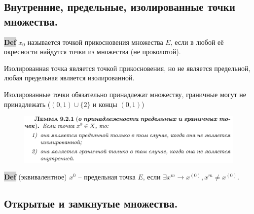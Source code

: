 \documentclass{article}
\begin{document}
\subsection{Внутренние, предельные, изолированные точки множества.}
\begin{figure}[h!]
    \centering
\end{figure}
{\bfseries\colorbox{lightgray}{Def}} $x_0$ называется точкой прикосновения множества $E$, если в любой её окресности найдутся точки из множества (не проколотой).

Изолированная точка является точкой прикосновения, но не является предельной, любая предельная является изолированной.

Изолированные точки обязательно принадлежат множеству, граничные могут не принадлежать ($(0,1)\cup \{2\}$ и концы $(0,1)$)
\begin{figure}[h!]
    \centering
    \includegraphics[width=\textwidth]{8.png}
    \vspace{-1cm}
\end{figure}

{\bfseries\colorbox{lightgray}{Def}} (эквивалентное) $x^{0}$ -- предельная точка $E$, если $\exists x^{m} \to x^{(0)}, x^{m}\neq x^{(0)}$.

\newpage
\subsection{Открытые и замкнутые множества.}
\end{document}
